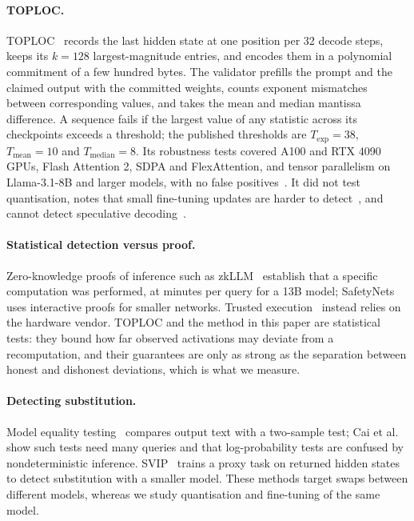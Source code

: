 \documentclass[11pt]{article}
\begin{document}
\paragraph{TOPLOC.}
TOPLOC~\cite{ong2025toploc} records the last hidden state at one position per 32 decode steps, keeps its $k{=}128$ largest-magnitude entries, and encodes them in a polynomial commitment of a few hundred bytes.
The validator prefills the prompt and the claimed output with the committed weights, counts exponent mismatches between corresponding values, and takes the mean and median mantissa difference.
A sequence fails if the largest value of any statistic across its checkpoints exceeds a threshold; the published thresholds are $T_{\exp}{=}38$, $T_{\text{mean}}{=}10$ and $T_{\text{median}}{=}8$.
Its robustness tests covered A100 and RTX 4090 GPUs, Flash Attention 2, SDPA and FlexAttention, and tensor parallelism on Llama-3.1-8B and larger models, with no false positives~\cite[\S5.6, Table~2]{ong2025toploc}.
It did not test quantisation, notes that small fine-tuning updates are harder to detect~\cite[\S6.5]{ong2025toploc}, and cannot detect speculative decoding~\cite[\S6.2]{ong2025toploc}.

\paragraph{Statistical detection versus proof.}
Zero-knowledge proofs of inference such as zkLLM~\cite{sun2024zkllm} establish that a specific computation was performed, at minutes per query for a 13B model; SafetyNets~\cite{ghodsi2017safetynets} uses interactive proofs for smaller networks.
Trusted execution~\cite{tramer2019slalom,cai2025auditing} instead relies on the hardware vendor.
TOPLOC and the method in this paper are statistical tests: they bound how far observed activations may deviate from a recomputation, and their guarantees are only as strong as the separation between honest and dishonest deviations, which is what we measure.

\paragraph{Detecting substitution.}
Model equality testing~\cite{gao2025model} compares output text with a two-sample test; Cai et al.~\cite{cai2025auditing} show such tests need many queries and that log-probability tests are confused by nondeterministic inference.
SVIP~\cite{sun2025svip} trains a proxy task on returned hidden states to detect substitution with a smaller model.
These methods target swaps between different models, whereas we study quantisation and fine-tuning of the same model.
\end{document}
